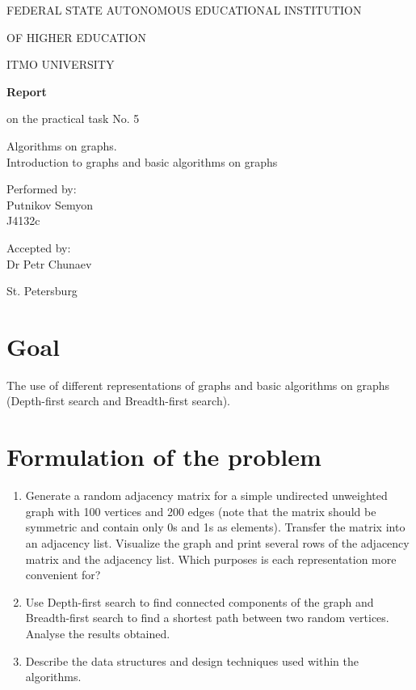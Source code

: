 \documentclass[a4paper,article,14pt]{extarticle}
\begin{document}
	\begin{titlepage}
		\begin{center}
			FEDERAL STATE AUTONOMOUS EDUCATIONAL INSTITUTION
			
			OF HIGHER EDUCATION
			
			ITMO UNIVERSITY
			\vspace{3cm}
			
			\large\textbf{Report}
			
			\large on the practical task No. 5
			
			\large \flqq Algorithms on graphs. \\ Introduction to graphs and basic algorithms on graphs\frqq
			\vspace{5cm}
			

			\begin{flushright}
				{Performed by:} \\
				Putnikov Semyon \\ 
				J4132c \\
			\end{flushright}
			
			
			\begin{flushright}
				{Accepted by:} \\
				Dr Petr Chunaev \\ 
			\end{flushright}
			\vfill
			
			{St. Petersburg}
			\par{\number\year}
		\end{center}
	\end{titlepage}

	\newpage
	
	\section{Goal}
	The use of different representations of graphs and basic algorithms on graphs (Depth-first search and Breadth-first search).
	
	\section{Formulation of the problem}
	\begin{enumerate}[label=\Roman*]
		\item Generate a random adjacency matrix for a simple undirected unweighted graph with 100 vertices and 200 edges (note that the matrix should be symmetric and contain only 0s and 1s as elements). Transfer the matrix into an adjacency list. Visualize the graph and print several rows of the adjacency matrix and the adjacency list. Which purposes is each representation more convenient for?
		\item Use Depth-first search to find connected components of the graph and Breadth-first search to find a shortest path between two random vertices. Analyse the results obtained.
		\item Describe the data structures and design techniques used within the algorithms.
	\end{enumerate}
	
\end{document}
